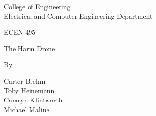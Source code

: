 \documentclass[12pt]{article}
\begin{document}
\begin{titlepage}
    \begin{center}
         \hfill
         \hfill
        
        {\Large College of Engineering\\
        Electrical and Computer Engineering Department\\}
        
        \vspace{2cm}
        {\Large ECEN 495}
        \vspace{0.5cm}
        
        {\Huge The Harm Drone}
        \vspace{3cm}
        
        {\large By\\}
        \vspace{0.1cm}
        \begin{Large}
        Carter Brehm \\
        \vspace{0.1cm}
        Toby Heinemann \\
        \vspace{0.1cm}
        Camryn Klintworth \\
        \vspace{0.1cm}
        Michael Maline\\
        \end{Large}
        

\end{center}
\end{titlepage}
\end{document}
